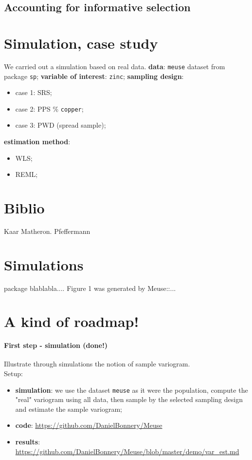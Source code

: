 \documentclass[12pt]{article}
\theoremstyle{definition}
\theoremstyle{remark}
\begin{document}
\subsection{Accounting for informative selection}

\section{Simulation, case study}
We carried out a simulation based on real data.
\textbf{data}: \texttt{meuse} dataset from package \texttt{sp};
\textbf{variable of interest}: \texttt{zinc};
\textbf{sampling design}:
    \begin{itemize}
        \item case 1: SRS;
        \item case 2: PPS \% \texttt{copper};
        \item case 3: PWD (spread sample);
    \end{itemize}
 \textbf{estimation method}:
    \begin{itemize}
        \item WLS;
        \item REML;
    \end{itemize}
\section{Biblio}

Kaar
Matheron.
Pfeffermann


\section{Simulations}

package blablabla....
Figure 1 was generated by Meuse::...

\appendix
\section{A kind of roadmap!}

    \paragraph{First step - simulation (done!)}
Illustrate through simulations the notion of sample variogram.\\
Setup:
\begin{itemize}    

    \item \textbf{simulation}: we use the dataset \texttt{meuse} as it were the population, compute the "real" variogram using all data, then sample by the selected sampling design and estimate the sample variogram;
    \item \textbf{code}: \url{https://github.com/DanielBonnery/Meuse}
    \item \textbf{results}: \url{https://github.com/DanielBonnery/Meuse/blob/master/demo/var_est.md}
\end{itemize}
\end{document}
